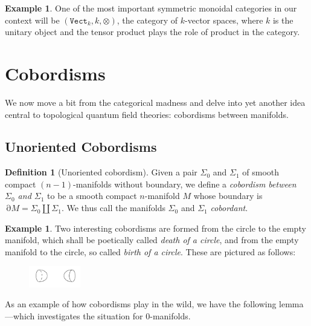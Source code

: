 \documentclass[11pt, reqno]{amsart}
\theoremstyle{definition}
\newtheorem{definition}[theorem]{Definition}
\newtheorem{example}[theorem]{Example}
\newcommand{\disj}{\amalg}     %
\DeclareMathOperator{\Bd}{\partial}
\newcommand{\catfont}{\texttt}
\newcommand{\Vect}{{\catfont{Vect}}}        %
\begin{document}
\begin{example}
\label{exp:vect-k-is-symmetric-monoidal}
One of the most important symmetric monoidal categories in our context will be
\((\Vect_k, k, \otimes)\), the category of \(k\)-vector spaces, where \(k\) is
the unitary object and the tensor product plays the role of product in the
category.
\end{example}

\section{Cobordisms}

We now move a bit from the categorical madness and delve into yet another idea
central to topological quantum field theories: cobordisms between manifolds.

\subsection{Unoriented Cobordisms}

\begin{definition}[Unoriented cobordism]
\label{def:unoriented-cobordism}
Given a pair \(\Sigma_0\) and \(\Sigma_1\) of smooth compact
\((n-1)\)-manifolds without boundary, we define a \emph{cobordism between
  \(\Sigma_0\) and \(\Sigma_1\)} to be a smooth compact \(n\)-manifold \(M\)
whose boundary is \(\Bd M = \Sigma_0 \disj \Sigma_1\). We thus call the
manifolds \(\Sigma_0\) and \(\Sigma_1\) \emph{cobordant}.
\end{definition}

\begin{example}
\label{exp:birth-death-circle}
Two interesting cobordisms are formed from the circle to the empty manifold,
which shall be poetically called \emph{death of a circle}, and from the empty
manifold to the circle, so called \emph{birth of a circle}. These are pictured
as follows:
\begin{figure}[h!]
\centering
\includegraphics[width=0.2\textwidth]{img/birth-death.png}
\end{figure}
\end{example}

As an example of how cobordisms play in the wild, we have the following
lemma---which investigates the situation for \(0\)-manifolds.
\end{document}
